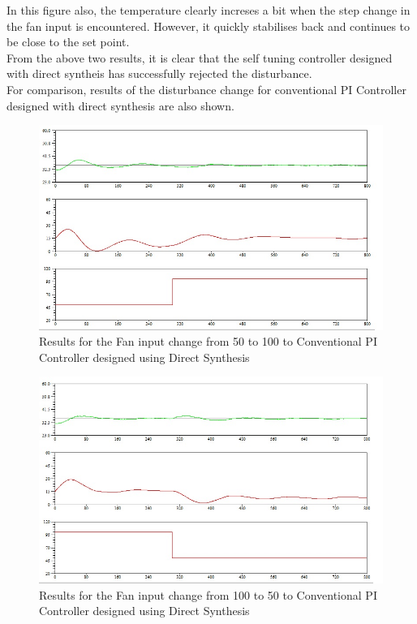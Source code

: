 In this figure also, the temperature clearly increses a bit when the step change in the fan input is encountered. However, it quickly stabilises back and continues to be close to the set point.\\

From the above two results, it is clear that the self tuning controller designed with direct syntheis has successfully rejected the disturbance.\\

For comparison, results of the disturbance change for conventional PI Controller designed with direct synthesis are also shown.
\newpage
\begin{figure}[h]
	\centering
\includegraphics[width=.7\linewidth]{Vikas_self/report_tex/PID_results/Conventional_Tuning/Fan_disturbance/Direct_Systhesis/step50to100.jpg}
	\caption{Results for the Fan input change from 50 to 100 to Conventional PI Controller designed using Direct Synthesis}
\end{figure}

\begin{figure}[h]
	\centering
\includegraphics[width=.7\linewidth]{Vikas_self/report_tex/PID_results/Conventional_Tuning/Fan_disturbance/Direct_Systhesis/step100to50.jpg}
	\caption{Results for the Fan input change from 100 to 50 to Conventional PI Controller designed using Direct Synthesis}
\end{figure}

